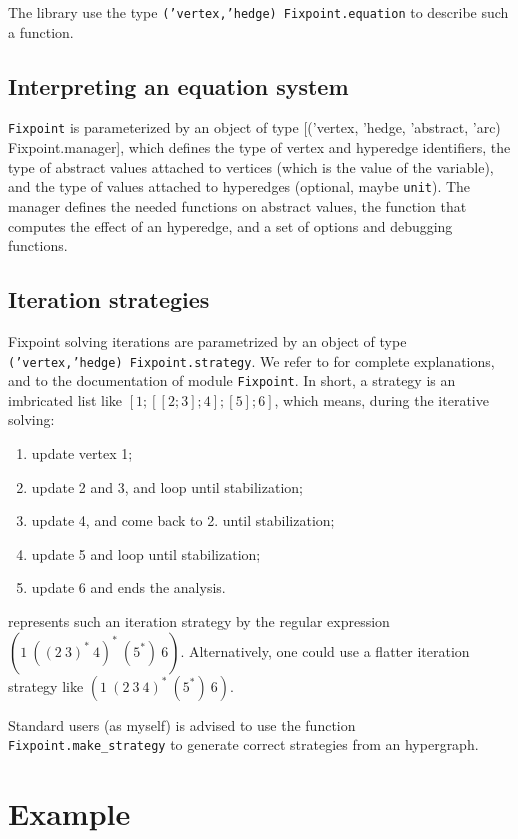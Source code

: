 \documentclass[twoside,10pt,a4paper]{report}
\begin{document}
The library use the type \texttt{('vertex,'hedge) Fixpoint.equation} to describe
such a function.

\subsection{Interpreting an equation system}

\texttt{Fixpoint} is parameterized by an object of type [('vertex,
'hedge, 'abstract, 'arc) Fixpoint.manager], which defines the type
of vertex and hyperedge identifiers, the type of abstract values
attached to vertices (which is the value of the variable), and the
type of values attached to hyperedges (optional, maybe
\texttt{unit}). The manager defines the needed functions on
abstract values, the function that computes the effect of an
hyperedge, and a set of options and debugging functions.

\subsection{Iteration strategies}

Fixpoint solving iterations are parametrized by an object of type
\texttt{('vertex,'hedge) Fixpoint.strategy}. We refer to
\cite{bourdoncle93} for complete explanations, and to the
documentation of module \texttt{Fixpoint}. In short, a strategy
is an imbricated list like $[1; [[2;3]; 4]; [5]; 6]$, which
means, during the iterative solving:
\begin{enumerate}\setlength{\itemsep}{0pt}
\item update vertex 1;
\item update 2 and 3, and loop until stabilization;
\item update 4, and come back to 2. until stabilization;
\item update 5 and loop until stabilization;
\item update 6 and ends the analysis.
\end{enumerate}
\cite{bourdoncle93} represents such an iteration strategy by the
regular expression $(1~ ((2~3)^*~ 4)^*~ (5^*)~ 6)$. Alternatively, one
could use a flatter iteration strategy like $(1~ (2~ 3~ 4)^*~ (5^*)~ 6)$.

Standard users (as myself) is advised to use the function
\texttt{Fixpoint.make\_strategy} to generate correct strategies
from an hypergraph.

\section{Example}
\end{document}
